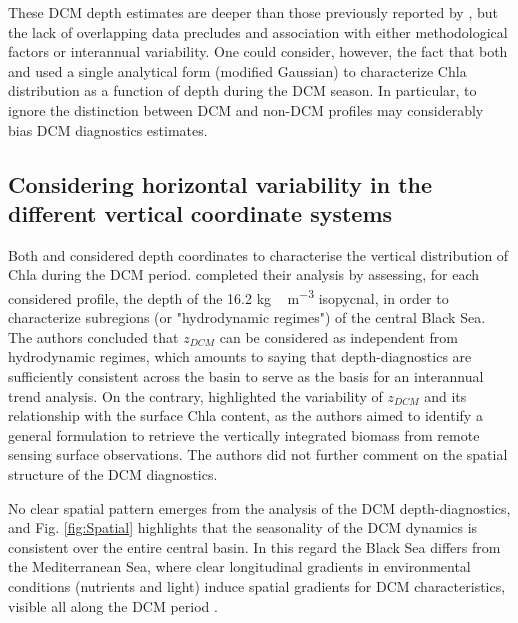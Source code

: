 \documentclass[journal abbreviation, manuscript]{copernicus}
\begin{document}
These DCM depth estimates are deeper than those previously reported by \citet{Finenko2005}, but the lack of overlapping data precludes and association with either methodological factors or interannual variability.
One could consider, however, the fact that 
both \citet{Yunev2005} and \cite{Finenko2005} used a single analytical form (modified Gaussian) to characterize Chla distribution as a function of depth during the DCM season.
In particular, to ignore the distinction between DCM and non-DCM profiles may considerably bias DCM diagnostics estimates.

\subsection{Considering horizontal variability in the different vertical coordinate systems}
Both \citet{Yunev2005} and \cite{Finenko2005} considered depth coordinates to characterise the vertical distribution of Chla during the DCM period. 
\citet{Yunev2005} completed their analysis by assessing, for each considered profile, the depth of the 16.2 \unit{kg\,m^{-3}} isopycnal, in order to characterize subregions (or "hydrodynamic regimes") of the central Black Sea.
The authors concluded that $z_{DCM}$ can be considered as independent from hydrodynamic regimes, which amounts to saying that depth-diagnostics are sufficiently consistent across the basin to serve as the basis for an interannual trend analysis.  
On the contrary, \citet{Finenko2005} highlighted the variability of $z_{DCM}$ and its relationship with the surface Chla content, as the authors aimed to identify a general formulation to retrieve the vertically integrated biomass from remote sensing surface observations.
The authors did not further comment on the spatial structure of the DCM diagnostics. 

No clear spatial pattern emerges from the analysis of the DCM depth-diagnostics, and  Fig. \ref{fig:Spatial} highlights that the seasonality of the DCM dynamics is consistent over the entire central basin. 
In this regard the Black Sea differs from the Mediterranean Sea, where clear longitudinal gradients in environmental conditions (nutrients and light) induce spatial gradients for DCM characteristics, visible all along the DCM period \citep{Letelier2004, Mignot2014, Lavigne2015}.
\end{document}
